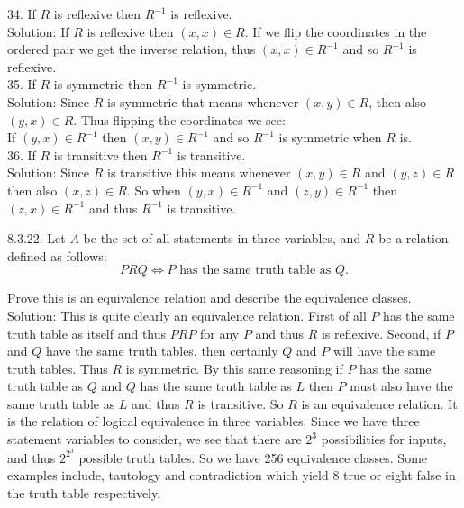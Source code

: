 \documentclass[10 pt]{amsart}
\theoremstyle{definition}
\theoremstyle{remark}
\numberwithin{equation}{subsection}
\begin{document}
34. If $R$ is reflexive then $R^{-1}$ is reflexive.\\

Solution: If $R$ is reflexive then $(x,x)\in R$.  If we flip the coordinates in the ordered pair we get the inverse relation, thus $(x,x)\in R^{-1}$ and so $R^{-1}$ is reflexive.\\

35. If $R$ is symmetric then $R^{-1}$ is symmetric.\\

Solution:  Since $R$ is symmetric that means whenever $(x,y)\in R$, then also $(y,x)\in R$. Thus flipping the coordinates we see:\\
If $(y,x)\in R^{-1}$ then $(x,y)\in R^{-1}$ and so $R^{-1}$ is symmetric when $R$ is.\\

36. If $R$ is transitive then $R^{-1}$ is transitive.\\

Solution: Since $R$ is transitive this means whenever $(x,y)\in R$ and $(y,z)\in R$ then also $(x,z)\in R$.  So when $(y,x)\in R^{-1}$ and $(z,y)\in R^{-1}$ then
$(z,x)\in R^{-1}$ and thus $R^{-1}$ is transitive.
\newpage

8.3.22. Let $A$ be the set of all statements in three variables, and $R$ be a relation defined as follows:
\[
P R Q \Longleftrightarrow P \text{ has the same truth table as } Q.
\]

Prove this is an equivalence relation and describe the equivalence classes.\\

Solution:  This is quite clearly an equivalence relation.  First of all $P$ has the same truth table as itself and thus $PRP$ for any $P$ and thus $R$ is reflexive.  Second, if $P$ and $Q$ have the same truth tables, then certainly $Q$ and $P$ will have the same truth tables.  Thus $R$ is symmetric.  By this same reasoning if $P$ has the same truth table as $Q$ and $Q$ has the same truth table as $L$ then $P$ must also have the same truth table as $L$ and thus $R$ is transitive.  So $R$ is an equivalence relation. It is the relation of logical equivalence in three variables.  Since we have three statement variables to consider, we see that there are $2^3$ possibilities for inputs, and thus $2^{2^3}$ possible truth tables.  So we have 256 equivalence classes.  Some examples include, tautology and contradiction which yield 8 true or eight false in the truth table respectively.  

\newpage
\end{document}
